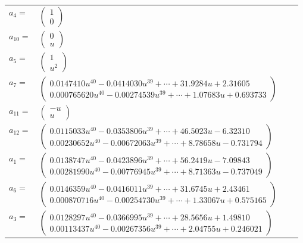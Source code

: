\documentclass[1p]{elsarticle_modified}
\theoremstyle{definition}
\begin{document}
\begin{tabular}{m{7pt} m{180pt} m{7pt} m{180pt} }
\flushright $a_{4}=$&$\begin{pmatrix}1\\0\end{pmatrix}$ \\
\flushright $a_{10}=$&$\begin{pmatrix}0\\u\end{pmatrix}$ \\
\flushright $a_{5}=$&$\begin{pmatrix}1\\u^2\end{pmatrix}$ \\
\flushright $a_{7}=$&$\begin{pmatrix}0.0147410 u^{40}-0.0414030 u^{39}+\cdots+31.9284 u+2.31605\\0.000765620 u^{40}-0.00274539 u^{39}+\cdots+1.07683 u+0.693733\end{pmatrix}$ \\
\flushright $a_{11}=$&$\begin{pmatrix}- u\\u\end{pmatrix}$ \\
\flushright $a_{12}=$&$\begin{pmatrix}0.0115033 u^{40}-0.0353806 u^{39}+\cdots+46.5023 u-6.32310\\0.00230652 u^{40}-0.00672063 u^{39}+\cdots+8.78658 u-0.731794\end{pmatrix}$ \\
\flushright $a_{1}=$&$\begin{pmatrix}0.0138747 u^{40}-0.0423896 u^{39}+\cdots+56.2419 u-7.09843\\0.00281990 u^{40}-0.00776945 u^{39}+\cdots+8.71363 u-0.737049\end{pmatrix}$ \\
\flushright $a_{6}=$&$\begin{pmatrix}0.0146359 u^{40}-0.0416011 u^{39}+\cdots+31.6745 u+2.43461\\0.000870716 u^{40}-0.00254730 u^{39}+\cdots+1.33067 u+0.575165\end{pmatrix}$ \\
\flushright $a_{3}=$&$\begin{pmatrix}0.0128297 u^{40}-0.0366995 u^{39}+\cdots+28.5656 u+1.49810\\0.00113437 u^{40}-0.00267356 u^{39}+\cdots+2.04755 u+0.246021\end{pmatrix}$ \\

\end{tabular}
\end{document}
